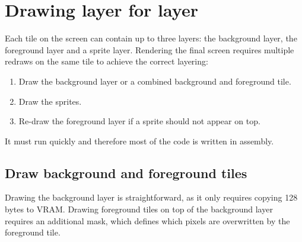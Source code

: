 \documentclass[book.tex]{subfiles}
\begin{document}
\pagebreak
\section{Drawing layer for layer}
Each tile on the screen can contain up to three layers: the background layer, the foreground layer and a sprite layer. Rendering the final screen requires multiple redraws on the same tile to achieve the correct layering:
\begin{enumerate}
  \item Draw the background layer or a combined background and foreground tile.
  \item Draw the sprites.
  \item Re-draw the foreground layer if a sprite should not appear on top.
\end{enumerate}

\par
It must run quickly and therefore most of the code is written in assembly.

\subsection{Draw background and foreground tiles}
Drawing the background layer is straightforward, as it only requires copying 128 bytes to VRAM. Drawing foreground tiles on top of the background layer requires an additional mask, which defines which pixels are overwritten by the foreground tile.\\
\end{document}
